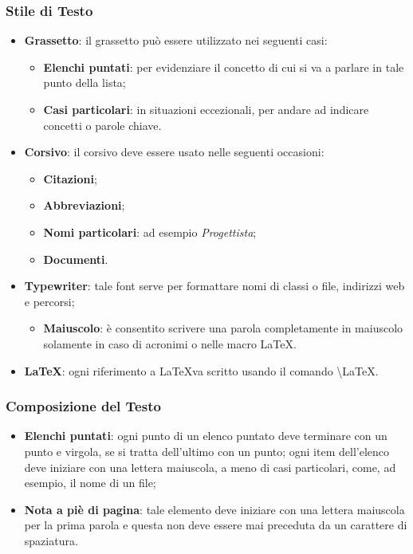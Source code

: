\subsubsection{Stile di Testo}
\begin{itemize}
\item \textbf{Grassetto}: il grassetto può essere utilizzato nei seguenti casi:
\begin{itemize}
\item \textbf{Elenchi puntati}: per evidenziare il concetto di cui si va a parlare in tale punto della lista;
\item \textbf{Casi particolari}: in situazioni eccezionali, per andare ad indicare concetti o parole chiave.
\end{itemize}
\item \textbf{Corsivo}: il corsivo deve essere usato nelle seguenti occasioni:
\begin{itemize}
\item \textbf{Citazioni};
\item \textbf{Abbreviazioni};
\item \textbf{Nomi particolari}: ad esempio \textit{Progettista};
\item \textbf{Documenti}.
\end{itemize}
\item \textbf{Typewriter}: tale font serve per formattare nomi di classi o file, indirizzi web e percorsi;
\begin{itemize}
\item \textbf{Maiuscolo}: è consentito scrivere una parola completamente in maiuscolo solamente in caso di acronimi o nelle macro \LaTeX.
\end{itemize}
\item \textbf{\LaTeX}: ogni riferimento a \LaTeX va scritto usando il comando \textbackslash{LaTeX}.
\end{itemize}

\subsubsection{Composizione del Testo}
\begin{itemize}
\item \textbf{Elenchi puntati}: ogni punto di un elenco puntato deve terminare con un punto e virgola, se si tratta dell'ultimo con un punto; ogni item dell'elenco deve iniziare con una lettera maiuscola, a meno di casi particolari, come, ad esempio, il nome di un file;
\item \textbf{Nota a piè di pagina}: tale elemento deve iniziare con una lettera maiuscola per la prima parola e questa non deve essere mai preceduta da un carattere di spaziatura. 
\end{itemize}

